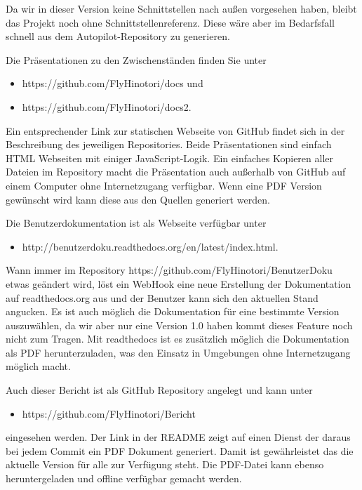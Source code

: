 \documentclass[12pt]{article}
\begin{document}
Da wir in dieser Version keine Schnittstellen nach außen vorgesehen haben, bleibt das Projekt noch ohne Schnittstellenreferenz. Diese wäre aber im Bedarfsfall schnell aus dem Autopilot-Repository zu generieren.
\newline

Die Präsentationen zu den Zwischenständen finden Sie unter
\begin{itemize}
  \item https://github.com/FlyHinotori/docs und
  \item https://github.com/FlyHinotori/docs2.
\end{itemize}
Ein entsprechender Link zur statischen Webseite von GitHub findet sich in der Beschreibung des jeweiligen Repositories. Beide Präsentationen sind einfach HTML Webseiten mit einiger JavaScript-Logik. Ein einfaches Kopieren aller Dateien im Repository macht die Präsentation auch außerhalb von GitHub auf einem Computer ohne Internetzugang verfügbar. Wenn eine PDF Version gewünscht wird kann diese aus den Quellen generiert werden.
\newline

Die Benutzerdokumentation ist als Webseite verfügbar unter
\begin{itemize}
  \item http://benutzerdoku.readthedocs.org/en/latest/index.html.
\end{itemize}
Wann immer im Repository https://github.com/FlyHinotori/BenutzerDoku etwas geändert wird, löst ein WebHook eine neue Erstellung der Dokumentation auf readthedocs.org aus und der Benutzer kann sich den aktuellen Stand angucken. Es ist auch möglich die Dokumentation für eine bestimmte Version auszuwählen, da wir aber nur eine Version 1.0 haben kommt dieses Feature noch nicht zum Tragen. Mit readthedocs ist es zusätzlich möglich die Dokumentation als PDF herunterzuladen, was den Einsatz in Umgebungen ohne Internetzugang möglich macht.
\newline

Auch dieser Bericht ist als GitHub Repository angelegt und kann unter 
\begin{itemize}
  \item https://github.com/FlyHinotori/Bericht
\end{itemize}
eingesehen werden. Der Link in der README zeigt auf einen Dienst der daraus bei jedem Commit ein PDF Dokument generiert. Damit ist gewährleistet das die aktuelle Version für alle zur Verfügung steht. Die PDF-Datei kann ebenso heruntergeladen und offline verfügbar gemacht werden.
\end{document}
